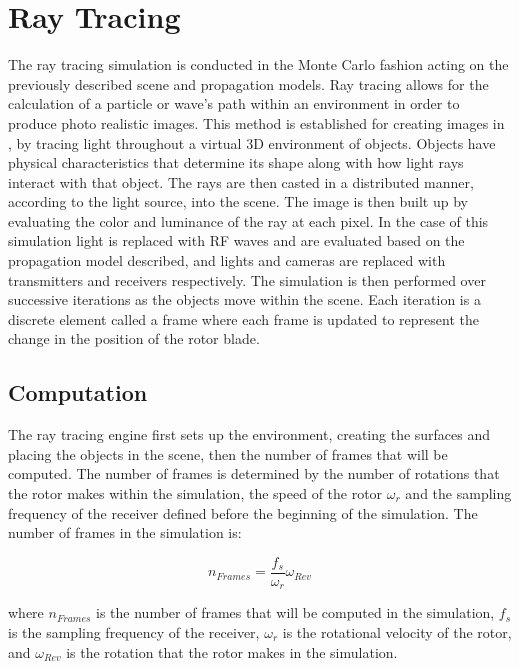 \section{Ray Tracing}

The ray tracing simulation is conducted in the Monte Carlo fashion acting on the previously described scene and propagation models. Ray tracing allows for the calculation of a particle or wave's path within an environment in order to produce photo realistic images. This method is established for creating images in \cite{Suffern2007}, \cite{Pharr2010} by tracing light throughout a virtual 3D environment of objects. Objects have physical characteristics that determine its shape along with how light rays interact with that object. The rays are then casted in a distributed manner, according to the light source, into the scene. The image is then built up by evaluating the color and luminance of the ray at each pixel. In the case of this simulation light is replaced with RF waves and are evaluated based on the propagation model described, and lights and cameras are replaced with transmitters and receivers respectively. The simulation is then performed over successive iterations as the objects move within the scene. Each iteration is a discrete element called a frame where each frame is updated to represent the change in the position of the rotor blade.

\subsection{Computation}
The ray tracing engine first sets up the environment, creating the surfaces and placing the objects in the scene, then the number of frames that will be computed. The number of frames is determined by the number of rotations that the rotor makes within the simulation, the speed of the rotor $\omega_r$ and the sampling frequency of the receiver defined before the beginning of the simulation. The number of frames in the simulation is:

\begin{equation}
	n_{Frames} = \frac{f_s}{\omega_r}\omega_{Rev}
	\label{eqn:frames}
\end{equation}

where $n_{Frames}$ is the number of frames that will be computed in the simulation, $f_s$ is the sampling frequency of the receiver, $\omega_r$ is the rotational velocity of the rotor, and $\omega_{Rev}$ is the rotation that the rotor makes in the simulation.

